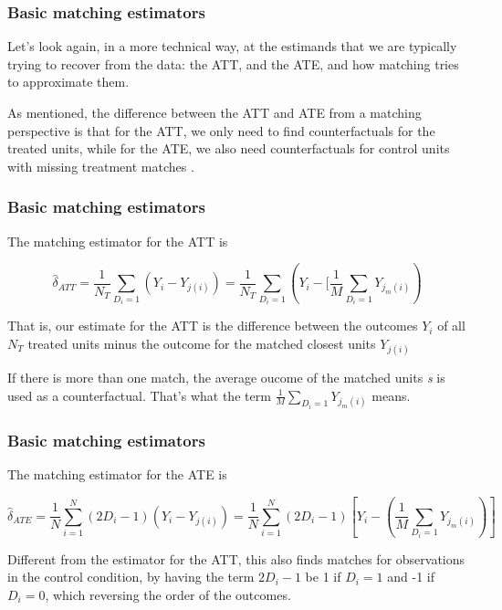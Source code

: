\documentclass[12pt,english,dvipsnames,aspectratio=169,handout]{beamer}\usepackage[]{graphicx}\usepackage[]{xcolor}
\begin{document}
\begin{frame}
  \frametitle{Basic matching estimators}
\footnotesize

Let's look again, in a more technical way, at the estimands that we are typically trying to recover from the data: the ATT, and the ATE, and how matching tries to approximate them.

As mentioned, the difference between the ATT and ATE from a matching perspective is that for the ATT, we only need to find counterfactuals for the treated units, while for the ATE, we also need counterfactuals for control units with missing treatment matches \cite[119]{cunningham_causal_2021}.

\vspace{3cm}

\end{frame}


\begin{frame}
  \frametitle{Basic matching estimators}
\footnotesize

The matching estimator for the ATT is 

\begin{equation*} \displaystyle
\hat{\delta}_{ATT} = \frac{1}{N_T}\sum_{D_{i}=1}(Y_i - Y_{j(i)}) = \frac{1}{N_T} \sum_{D_{i}=1}(Y_i - [\frac{1}{M}\sum_{D_{i}=1}Y_{j_{m}(i)})
\end{equation*} \footnotesize

That is, our estimate for the ATT is the difference between the outcomes $Y_i$ of all $N_T$ treated units minus the outcome for the matched closest units $Y_{j(i)}$

If there is more than one match, the average oucome of the matched units \emph{s} is used as a counterfactual. That's what the term $\frac{1}{M}\sum_{D_{i}=1}Y_{j_{m}(i)}$ means.

\vspace{3cm}

\end{frame}



\begin{frame}
  \frametitle{Basic matching estimators}
\footnotesize

The matching estimator for the ATE is 

\begin{equation*} \displaystyle
\hat{\delta}_{ATE} = \frac{1}{N}\sum_{i=1}^{N}(2D_i-1)(Y_i - Y_{j(i)}) =\frac{1}{N}\sum_{i=1}^{N}(2D_i-1)[Y_i - (\frac{1}{M} \sum_{D_{i}=1}Y_{j_{m}(i)})]
\end{equation*} \footnotesize

Different from the estimator for the ATT, this also finds matches for observations in the control condition, by having the term $2D_i-1$ be 1 if $D_i=1$ and -1 if $D_i=0$, which reversing the order of the outcomes.

\vspace{3cm}
\end{frame}
\end{document}
